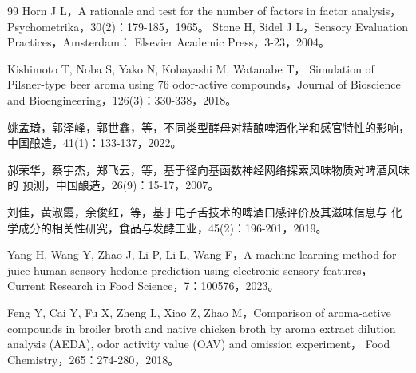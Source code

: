 \begin{thebibliography}{99}
 Horn J L，A rationale and test for the number of factors in factor
analysis，Psychometrika，30(2)：179-185，1965。
 Stone H, Sidel J L，Sensory Evaluation Practices，Amsterdam：
Elsevier Academic Press，3-23，2004。

 Kishimoto T, Noba S, Yako N, Kobayashi M, Watanabe T，
Simulation of Pilsner-type beer aroma using 76 odor-active compounds，Journal of
Bioscience and Bioengineering，126(3)：330-338，2018。

 姚孟琦，郭泽峰，郭世鑫，等，不同类型酵母对精酿啤酒化学和感官特性的影响，
中国酿造，41(1)：133-137，2022。

 郝荣华，蔡宇杰，郑飞云，等，基于径向基函数神经网络探索风味物质对啤酒风味的
预测，中国酿造，26(9)：15-17，2007。

 刘佳，黄淑霞，余俊红，等，基于电子舌技术的啤酒口感评价及其滋味信息与
化学成分的相关性研究，食品与发酵工业，45(2)：196-201，2019。

 Yang H, Wang Y, Zhao J, Li P, Li L, Wang F，A machine learning method
for juice human sensory hedonic prediction using electronic sensory features，Current
Research in Food Science，7：100576，2023。

 Feng Y, Cai Y, Fu X, Zheng L, Xiao Z, Zhao M，Comparison of
aroma-active compounds in broiler broth and native chicken broth by aroma extract
dilution analysis (AEDA), odor activity value (OAV) and omission experiment，
Food Chemistry，265：274-280，2018。

\end{thebibliography}
